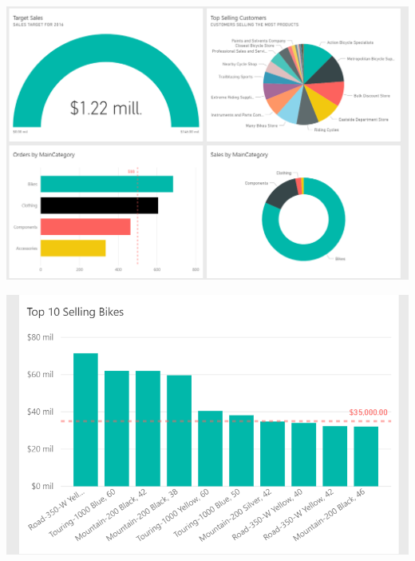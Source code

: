 \begin{itemize}
\begin{enumerate}
\begin{center}
\includegraphics[scale=0.60]{./Imagenes/ejer3_panel1.png}
\end{center}
\begin{center}
\includegraphics[scale=0.55]{./Imagenes/ejer3_panel2.png}
\end{center}

\end{enumerate}

\end{itemize}


